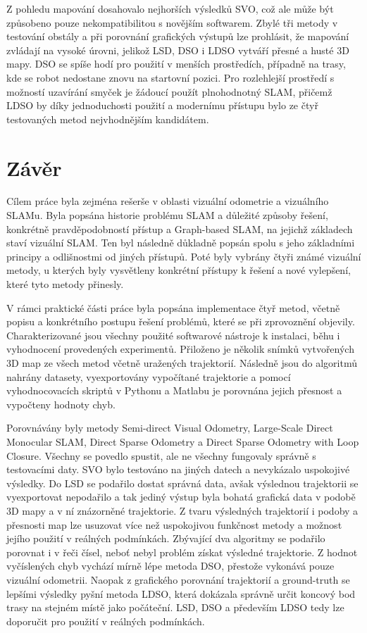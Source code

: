 \documentclass[12pt,a4paper]{report}
\begin{document}
Z pohledu mapování dosahovalo nejhorších výsledků SVO, což ale může být způsobeno pouze nekompatibilitou s novějším softwarem. Zbylé tři metody v testování obstály a při porovnání grafických výstupů lze prohlásit, že mapování zvládají na vysoké úrovni, jelikož LSD, DSO i LDSO vytváří přesné a husté 3D mapy. DSO se spíše hodí pro použití v menších prostředích, případně na trasy, kde se robot nedostane znovu na startovní pozici. Pro rozlehlejší prostředí s možností uzavírání smyček je žádoucí použít plnohodnotný SLAM, přičemž LDSO by díky jednoduchosti použití a modernímu přístupu bylo ze čtyř testovaných metod nejvhodnějším kandidátem.

\chapter{Závěr}
Cílem práce byla zejména rešerše v oblasti vizuální odometrie a vizuálního SLAMu. Byla popsána historie problému SLAM a důležité způsoby řešení, konkrétně pravděpodobností přístup a Graph-based SLAM, na jejichž základech staví vizuální SLAM. Ten byl následně důkladně popsán spolu s jeho základními principy a odlišnostmi od jiných přístupů. Poté byly vybrány čtyři známé vizuální metody, u kterých byly vysvětleny konkrétní přístupy k řešení a nové vylepšení, které tyto metody přinesly.

V rámci praktické části práce byla popsána implementace čtyř metod, včetně popisu a konkrétního postupu řešení problémů, které se při zprovoznění objevily. Charakterizované jsou všechny použité softwarové nástroje k instalaci, běhu i vyhodnocení provedených experimentů. Přiloženo je několik snímků vytvořených 3D map ze všech metod včetně uražených trajektorií. Následně jsou do algoritmů nahrány datasety, vyexportovány vypočítané trajektorie a pomocí vyhodnocovacích skriptů v Pythonu a Matlabu je porovnána jejich přesnost a vypočteny hodnoty chyb.

Porovnávány byly metody Semi-direct Visual Odometry, Large-Scale Direct Monocular SLAM, Direct Sparse Odometry a Direct Sparse Odometry with Loop Closure. Všechny se povedlo spustit, ale ne všechny fungovaly správně s testovacími daty. SVO bylo testováno na jiných datech a nevykázalo uspokojivé výsledky. Do LSD se podařilo dostat správná data, avšak výslednou trajektorii se vyexportovat nepodařilo a tak jediný výstup byla bohatá grafická data v podobě 3D mapy a v ní znázorněné trajektorie. Z tvaru výsledných trajektorií i podoby a přesnosti map lze usuzovat více než uspokojivou funkčnost metody a možnost jejího použití v reálných podmínkách. Zbývající dva algoritmy se podařilo porovnat i v řeči čísel, neboť nebyl problém získat výsledné trajektorie. Z hodnot vyčíslených chyb vychází mírně lépe metoda DSO, přestože vykonává pouze vizuální odometrii. Naopak z grafického porovnání trajektorií a ground-truth se lepšími výsledky pyšní metoda LDSO, která dokázala správně určit koncový bod trasy na stejném místě jako počáteční. LSD, DSO a především LDSO tedy lze doporučit pro použití v reálných podmínkách.
\end{document}
